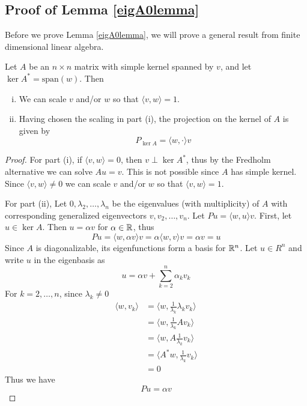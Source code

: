 \documentclass[thesis.tex]{subfiles}
\begin{document}
\subsection{Proof of Lemma \ref{eigA0lemma}}

Before we prove Lemma \ref{eigA0lemma}, we will prove a general result from finite dimensional linear algebra.

\begin{lemma}\label{kernelprojlemma}
Let $A$ be an $n \times n$ matrix with simple kernel spanned by $v$, and let $\ker A^* = \text{span}(w)$. Then 
\begin{enumerate}[(i)]
\item We can scale $v$ and/or $w$ so that $\langle v, w \rangle = 1$.
\item Having chosen the scaling in part (i), the projection on the kernel of $A$ is given by
\[
P_{\ker A} = \langle w, \cdot \rangle v
\]
\end{enumerate}
\begin{proof}
For part (i), if $\langle v, w \rangle = 0$, then $v \perp \ker A^*$, thus by the Fredholm alternative we can solve $A u = v$. This is not possible since $A$ has simple kernel. Since $\langle v, w \rangle \neq 0$ we can scale $v$ and/or $w$ so that $\langle v, w \rangle = 1$.

For part (ii), Let $0, \lambda_2, \dots, \lambda_n$ be the eigenvalues (with multiplicity) of $A$ with corresponding generalized eigenvectors $v, v_2, \dots, v_n$. Let $P u = \langle w, u \rangle v$. First, let $u \in \ker A$. Then $u = \alpha v$ for $\alpha \in \mathbb{R}$, thus 
\[
P u = \langle w, \alpha v \rangle v = \alpha \langle w, v \rangle v = \alpha v = u
\]
Since $A$ is diagonalizable, its eigenfunctions form a basis for $\mathbb{R}^n$. Let $u \in R^n$ and write $u$ in the eigenbasis as
\[
u = \alpha v + \sum_{k=2}^n \alpha_k v_k
\]
For $k = 2, \dots, n$, since $\lambda_k \neq 0$
\begin{align*}
\langle w, v_k \rangle &= \langle w, \frac{1}{\lambda_k}\lambda_k v_k \rangle \\
&= \langle w, \frac{1}{\lambda_k} A v_k \rangle \\
&= \langle w, A \frac{1}{\lambda_k} v_k \rangle \\
&= \langle A^* w, \frac{1}{\lambda_k} v_k \rangle \\
&= 0
\end{align*}
Thus we have
\[
P u = \alpha v
\]
\end{proof}
\end{lemma}
\end{document}
